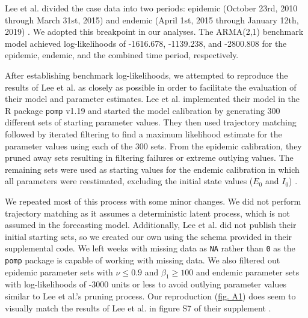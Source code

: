 \documentclass[12pt]{article}
\begin{document}
  Lee et al. divided the case data into two periods: epidemic (October 23rd, 2010 through March 31st, 2015) and endemic (April 1st, 2015 through January 12th, 2019) \cite{Lee_supp}. We adopted this breakpoint in our analyses. The ARMA(2,1) benchmark model achieved log-likelihoods of -1616.678, -1139.238, and -2800.808 for the epidemic, endemic, and the combined time period, respectively.
  
 After establishing benchmark log-likelihoods, we attempted to reproduce the results of Lee et al. as closely as possible in order to facilitate the evaluation of their model and parameter estimates. Lee et al. implemented their model in the R package \texttt{pomp} v1.19 and started the model calibration by generating 300 different sets of starting parameter values. They then used trajectory matching followed by iterated filtering to find a maximum likelihood estimate for the parameter values using each of the 300 sets. From the epidemic calibration, they pruned away sets resulting in filtering failures or extreme outlying values. The remaining sets were used as starting values for the endemic calibration in which all parameters were reestimated, excluding the initial state values ($E_0$ and $I_0$) \cite{Lee_supp}.

  We repeated most of this process with some minor changes. We did not perform trajectory matching as it assumes a deterministic latent process, which is not assumed in the forecasting model. Additionally, Lee et al. did not publish their initial starting sets, so we created our own using the schema provided in their supplemental code. We left weeks with missing data as \texttt{NA} rather than \texttt{0} as the \texttt{pomp} package is capable of working with missing data. We also filtered out epidemic parameter sets with $\nu \leq 0.9$ and $\beta_1 \geq 100$ and endemic parameter sets with log-likelihoods of -3000 units or less to avoid outlying parameter values similar to Lee et al.'s pruning process. Our reproduction (\hyperref[fig:A1]{fig. A1}) does seem to visually match the results of Lee et al. in figure S7 of their supplement \cite{Lee_supp}. 







\newpage


\end{document}
